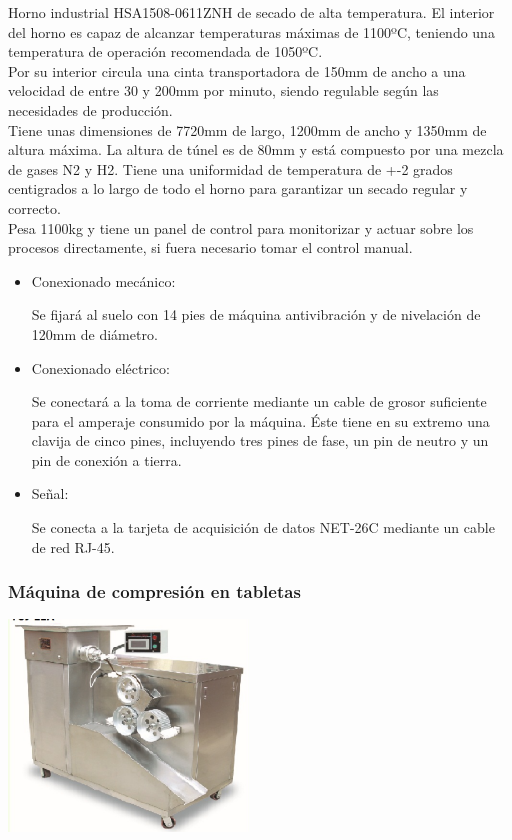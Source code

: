 	Horno industrial HSA1508-0611ZNH de secado de alta temperatura. El interior del horno es capaz de alcanzar temperaturas máximas de 1100ºC, teniendo una temperatura de operación recomendada de 1050ºC.\\

	Por su interior circula una cinta transportadora de 150mm de ancho a una velocidad de entre 30 y 200mm por minuto, siendo regulable según las necesidades de producción.\\

	Tiene unas dimensiones de 7720mm de largo, 1200mm de ancho y 1350mm de altura máxima. La altura de túnel es de 80mm y está compuesto por una mezcla de gases N2 y H2. Tiene una uniformidad de temperatura de +-2 grados centigrados a lo largo de todo el horno para garantizar un secado regular y correcto.\\

	Pesa 1100kg y tiene un panel de control para monitorizar y actuar sobre los procesos directamente, si fuera necesario tomar el control manual.

		\begin{itemize}
				\item{Conexionado mecánico:}
				
				Se fijará al suelo con 14 pies de máquina antivibración y de nivelación de 120mm de diámetro.

				\item{Conexionado eléctrico:}

				Se conectará a la toma de corriente mediante un cable de grosor suficiente para el amperaje consumido por la máquina. Éste tiene en su extremo una clavija de cinco pines, incluyendo tres pines de fase, un pin de neutro y un pin de conexión a tierra.  
				
				\item{Señal:}

				Se conecta a la tarjeta de acquisición de datos NET-26C mediante un cable de red RJ-45.
				
		\end{itemize}

	\newpage

	\subsubsection{Máquina de compresión en tabletas}

	\includegraphics[scale=1]{Datasheets/2MaquinaPrensadoFoto.png}

